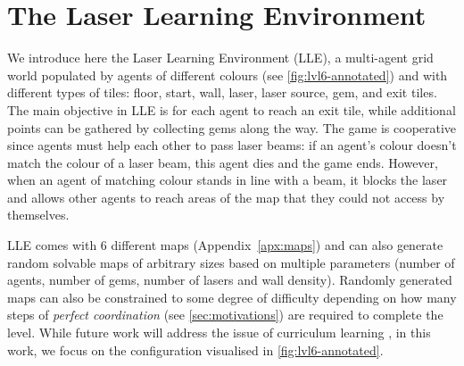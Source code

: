 \section{The Laser Learning Environment}
\label{sec:LLE}

We introduce here the Laser Learning Environment (LLE), a multi-agent grid world populated by agents of different colours (see \autoref{fig:lvl6-annotated}) and with different types of tiles: floor, start, wall, laser, laser source, gem, and exit tiles. The main objective in LLE is for each agent to reach an exit tile, while additional points can be gathered by collecting gems along the way. The game is cooperative since agents must help each other to pass laser beams:  if an agent's colour doesn't match the colour of a laser beam, this agent dies and the game ends. However, when an agent of matching colour stands in line with a beam, it blocks the laser and allows other agents to reach areas of the map that they could not access by themselves.

LLE comes with 6 different maps (Appendix~\ref{apx:maps}) and can also generate random solvable maps of arbitrary sizes based on multiple parameters (number of agents, number of gems, number of lasers and wall density). Randomly generated maps can also be constrained to some degree of difficulty depending on how many steps of \textit{perfect coordination} (see \autoref{sec:motivations}) are required to complete the level. While future work will address the issue of curriculum learning \citep{parker2022evolving}, in this work, we focus on the configuration visualised in  \autoref{fig:lvl6-annotated}.

